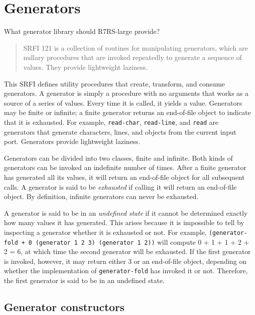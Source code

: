 \section{Generators}
 What generator library should R7RS-large provide?

\begin{quote}
SRFI 121 is a collection of routines for manipulating generators, which
are nullary procedures that are invoked repeatedly to generate a
sequence of values. They provide lightweight laziness.
\end{quote}


This SRFI defines utility procedures that create, transform, and consume
generators. A generator is simply a procedure with no arguments that
works as a source of a series of values. Every time it is called, it
yields a value. Generators may be finite or infinite; a finite generator
returns an end-of-file object to indicate that it is exhausted. For
example, \texttt{read-char}, \texttt{read-line}, and \texttt{read} are
generators that generate characters, lines, and objects from the current
input port. Generators provide lightweight laziness.



Generators can be divided into two classes, finite and infinite. Both
kinds of generators can be invoked an indefinite number of times. After
a finite generator has generated all its values, it will return an
end-of-file object for all subsequent calls. A generator is said to be
\emph{exhausted} if calling it will return an end-of-file object. By
definition, infinite generators can never be exhausted.

A generator is said to be in an \emph{undefined state} if it cannot be
determined exactly how many values it has generated. This arises because
it is impossible to tell by inspecting a generator whether it is
exhausted or not. For example,
\texttt{(generator-fold\ +\ 0\ (generator\ 1\ 2\ 3)\ (generator\ 1\ 2))}
will compute 0 + 1 + 1 + 2 + 2 = 6, at which time the second generator
will be exhausted. If the first generator is invoked, however, it may
return either 3 or an end-of-file object, depending on whether the
implementation of \texttt{generator-fold} has invoked it or not.
Therefore, the first generator is said to be in an undefined state.

\subsection{Generator constructors}\label{generator-constructors}


